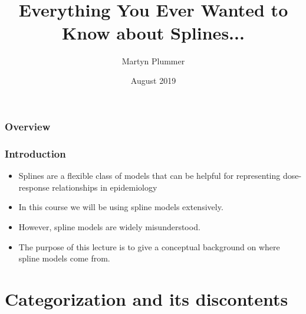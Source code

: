 \documentclass{beamer}
\title{~ \\ ~ \\ ~ \\ Everything You Ever Wanted to Know about Splines...}
\author{Martyn Plummer}
\institute[Warwick] %
{
  University of Warwick
}
\date[Tartu]{August 2019}
\begin{document}
\begin{frame}[plain]
  \titlepage
\end{frame}

\begin{frame}
  \frametitle{Overview}
  \tableofcontents
\end{frame}

\begin{frame}
  \frametitle{Introduction}

  \begin{itemize}
  \item Splines are a flexible class of models that can be helpful for
    representing dose-response relationships in epidemiology
  \item In this course we will be using spline models extensively.
  \item However, spline models are widely misunderstood.
  \item The purpose of this lecture is to give a conceptual background
    on where spline models come from.
  \end{itemize}
  
\end{frame}

\section{Categorization and its discontents}
\end{document}
